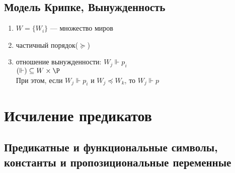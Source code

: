 \documentclass[english]{article}
\theoremstyle{plain}
\theoremstyle{remark}
\theoremstyle{definition}
\begin{document}
\subsection{Модель Крипке, Вынужденность}
\label{sec:orgb000dca}
\begin{defintion}
\-
\begin{enumerate}
\item \(W = \{W_i\}\) --- множество миров
\item частичный порядок(\(\succeq\))
\item отношение вынужденности: \(W_j \Vdash p_i\) \\
\((\Vdash)  \subseteq W \times \P\) \\
При этом, если \(W_j \Vdash p_i\) и \(W_j \preceq W_k\), то \(W_j \Vdash p\)
\end{enumerate}
\label{org295d109}
\end{defintion}
\section{Исчиление предикатов}
\label{sec:orgc8f39bc}
\subsection{Предикатные и функциональные символы, константы и пропозициональные переменные}
\label{sec:orgcf01154}
\end{document}
